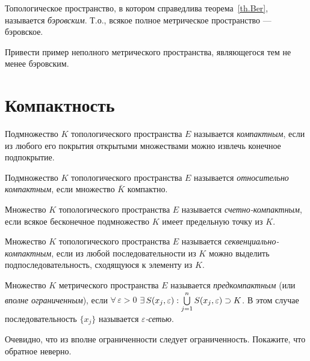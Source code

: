 \documentclass[10pt]{article}
\newcommand*{\p}[1]{#1\nobreak\discretionary{}{\hbox{$\mathsurround=0pt #1$}}{}}
\begin{document}
Топологическое пространство, в котором справедлива
теорема~\ref{th.Ber}, называется \emph{бэровским}. Т.о., всякое
полное метрическое пространство --- бэровское.

\begin{problem}
Привести пример неполного метрического пространства, являющегося тем
не менее бэровским.
\end{problem}


\section{Компактность}

\begin{df}
Подмножество $K$ топологического пространства $E$ называется
\emph{компактным}, если из любого его покрытия открытыми множествами
можно извлечь конечное подпокрытие.
\end{df}
\begin{df}
  Подмножество $K$ топологического пространства $E$ называется
  \emph{относительно компактным}, если множество $\bar{K}$ компактно.
\end{df}

\begin{df}
  Множество $K$ топологического пространства $E$ называется
  \emph{счетно-компактным}, если всякое бесконечное подмножество $K$
  имеет предельную точку из $K$.
\end{df}

\begin{df}
  Множество $K$ топологического пространства $E$ называется
  \emph{сек\-вен\-ци\-аль\-но-компактным}, если из любой
  последовательности из $K$ можно выделить подпоследовательность,
  сходящуюся к элементу из $K$.
\end{df}

\begin{df}
  Множество $K$ метрического пространства $E$ называется
  \emph{предкомпак\-тным} (или \emph{вполне ограниченным}), если
  $\forall\,\varepsilon>0$
  $\exists\,S(x_j,\varepsilon):\bigcup\limits_{j=1}^n
  S(x_j,\varepsilon)\p\supset K$. В этом случае последовательность
  $\{x_j\}$ называется \emph{$\varepsilon$-сетью}.
\end{df}


\begin{problem}
Очевидно, что из вполне ограниченности следует ограниченность.
Покажите, что обратное неверно.
\end{problem}
\end{document}
